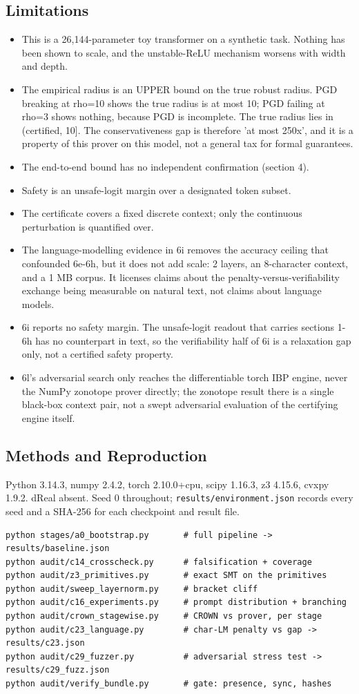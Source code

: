 \documentclass[sn-nature,pdflatex]{sn-jnl}
\begin{document}
\subsection{Limitations}
\begin{itemize}
\item This is a 26,144-parameter toy transformer on a synthetic task. Nothing has been shown to scale, and the unstable-ReLU mechanism worsens with width and depth.
\item The empirical radius is an UPPER bound on the true robust radius. PGD breaking at rho=10 shows the true radius is at most 10; PGD failing at rho=3 shows nothing, because PGD is incomplete. The true radius lies in (certified, 10]. The conservativeness gap is therefore 'at most 250x', and it is a property of this prover on this model, not a general tax for formal guarantees.
\item The end-to-end bound has no independent confirmation (section 4).
\item Safety is an unsafe-logit margin over a designated token subset.
\item The certificate covers a fixed discrete context; only the continuous perturbation is quantified over.
\item The language-modelling evidence in 6i removes the accuracy ceiling that confounded 6e-6h, but it does not add scale: 2 layers, an 8-character context, and a 1 MB corpus. It licenses claims about the penalty-versus-verifiability exchange being measurable on natural text, not claims about language models.
\item 6i reports no safety margin. The unsafe-logit readout that carries sections 1-6h has no counterpart in text, so the verifiability half of 6i is a relaxation gap only, not a certified safety property.
\item 6l's adversarial search only reaches the differentiable torch IBP engine, never the NumPy zonotope prover directly; the zonotope result there is a single black-box context pair, not a swept adversarial evaluation of the certifying engine itself.
\end{itemize}
\subsection{Methods and Reproduction}
Python 3.14.3, numpy 2.4.2, torch 2.10.0+cpu, scipy 1.16.3, z3 4.15.6, cvxpy 1.9.2. dReal absent. Seed 0 throughout; \texttt{results/environment.json} records every seed and a SHA-256 for each checkpoint and result file.
\begin{verbatim}
python stages/a0_bootstrap.py       # full pipeline -> results/baseline.json
python audit/c14_crosscheck.py      # falsification + coverage
python audit/z3_primitives.py       # exact SMT on the primitives
python audit/sweep_layernorm.py     # bracket cliff
python audit/c16_experiments.py     # prompt distribution + branching
python audit/crown_stagewise.py     # CROWN vs prover, per stage
python audit/c23_language.py        # char-LM penalty vs gap -> results/c23.json
python audit/c29_fuzzer.py          # adversarial stress test -> results/c29_fuzz.json
python audit/verify_bundle.py       # gate: presence, sync, hashes
\end{verbatim}
\end{document}
